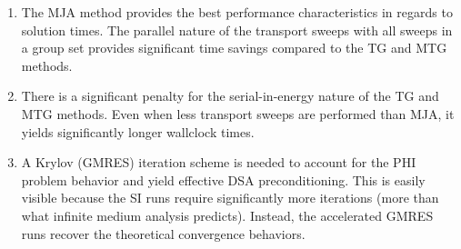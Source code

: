 \begin{enumerate}
\item The MJA method provides the best performance characteristics in regards to solution times. The parallel nature of the transport sweeps with all sweeps in a group set provides significant time savings compared to the TG and MTG methods.
\item There is a significant penalty for the serial-in-energy nature of the TG and MTG methods. Even when less transport sweeps are performed than MJA, it yields significantly longer wallclock times.
\item A Krylov (GMRES) iteration scheme is needed to account for the PHI problem behavior and yield effective DSA preconditioning. This is easily visible because the SI runs require significantly more iterations (more than what infinite medium analysis predicts). Instead, the accelerated GMRES runs recover the theoretical convergence behaviors.
\end{enumerate}

